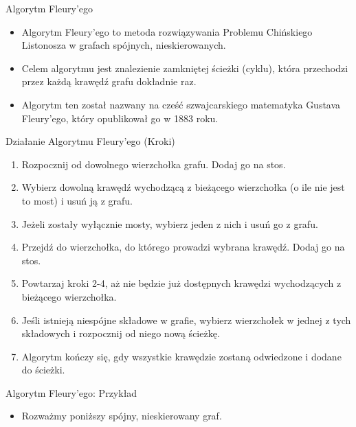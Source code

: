\documentclass[polish,envcountsect,10pt]{beamer}
\begin{document}
\begin{frame}{Algorytm Fleury'ego}
    \begin{itemize}
      \item Algorytm Fleury'ego to metoda rozwiązywania Problemu Chińskiego Listonosza w grafach spójnych, nieskierowanych.
      \item Celem algorytmu jest znalezienie zamkniętej ścieżki (cyklu), która przechodzi przez każdą krawędź grafu dokładnie raz.
      \item Algorytm ten został nazwany na cześć szwajcarskiego matematyka Gustava Fleury'ego, który opublikował go w 1883 roku.
    \end{itemize}
\end{frame}

\begin{frame}{Działanie Algorytmu Fleury'ego (Kroki)}
    \begin{enumerate}
        \item Rozpocznij od dowolnego wierzchołka grafu. Dodaj go na stos.
        \item Wybierz dowolną krawędź wychodzącą z bieżącego wierzchołka (o ile nie jest to most)  i usuń ją z grafu.
        \item Jeżeli zostały wyłącznie mosty, wybierz jeden z nich i usuń go z grafu.
        \item Przejdź do wierzchołka, do którego prowadzi wybrana krawędź. Dodaj go na stos.
        \item Powtarzaj kroki 2-4, aż nie będzie już dostępnych krawędzi wychodzących z bieżącego wierzchołka.
        \item Jeśli istnieją niespójne składowe w grafie, wybierz wierzchołek w jednej z tych składowych i rozpocznij od niego nową ścieżkę.
        \item Algorytm kończy się, gdy wszystkie krawędzie zostaną odwiedzone i dodane do ścieżki.
    \end{enumerate}
\end{frame}

\begin{frame}{Algorytm Fleury'ego: Przykład}
    \begin{itemize}
          \item Rozważmy poniższy spójny, nieskierowany graf.
    \end{itemize}
    \begin{center}
    \end{center}
\end{frame}
    
\end{document}
